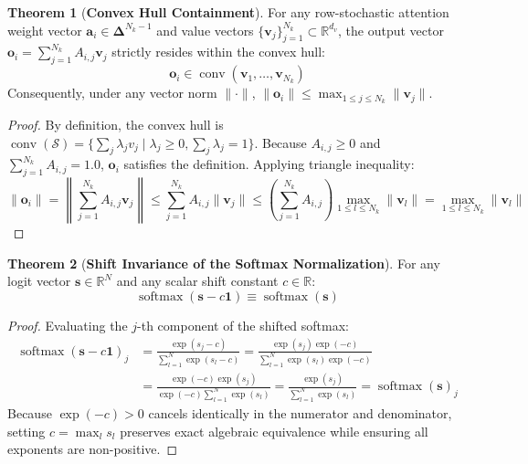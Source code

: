 \documentclass[11pt,a4paper]{article}
\theoremstyle{definition}
\newtheorem{theorem}{\textbf{Theorem}}[section]
\begin{document}
\begin{theorem}[\textbf{Convex Hull Containment}]
For any row-stochastic attention weight vector $\mathbf{a}_i \in \boldsymbol{\Delta}^{N_k - 1}$ and value vectors $\{\mathbf{v}_j\}_{j=1}^{N_k} \subset \mathbb{R}^{d_v}$, the output vector $\mathbf{o}_i = \sum_{j=1}^{N_k} A_{i, j} \mathbf{v}_j$ strictly resides within the convex hull:
{\boldmath
\begin{equation}
\mathbf{o}_i \in \operatorname{conv}(\mathbf{v}_1, \dots, \mathbf{v}_{N_k})
\end{equation}
}
Consequently, under any vector norm $\|\cdot\|$, $\|\mathbf{o}_i\| \le \max_{1 \le j \le N_k} \|\mathbf{v}_j\|$.
\end{theorem}

\begin{proof}
By definition, the convex hull is $\operatorname{conv}(\mathcal{S}) = \{ \sum_{j} \lambda_j v_j \mid \lambda_j \ge 0, \sum_j \lambda_j = 1 \}$. Because $A_{i, j} \ge 0$ and $\sum_{j=1}^{N_k} A_{i, j} = 1.0$, $\mathbf{o}_i$ satisfies the definition. Applying triangle inequality:
{\boldmath
\begin{equation}
\|\mathbf{o}_i\| = \left\| \sum_{j=1}^{N_k} A_{i, j} \mathbf{v}_j \right\| \le \sum_{j=1}^{N_k} A_{i, j} \|\mathbf{v}_j\| \le \left( \sum_{j=1}^{N_k} A_{i, j} \right) \max_{1 \le l \le N_k} \|\mathbf{v}_l\| = \max_{1 \le l \le N_k} \|\mathbf{v}_l\|
\end{equation}
}
\end{proof}

\begin{theorem}[\textbf{Shift Invariance of the Softmax Normalization}]
For any logit vector $\mathbf{s} \in \mathbb{R}^N$ and any scalar shift constant $c \in \mathbb{R}$:
{\boldmath
\begin{equation}
\operatorname{softmax}(\mathbf{s} - c \mathbf{1}) \equiv \operatorname{softmax}(\mathbf{s})
\end{equation}
}
\end{theorem}

\begin{proof}
Evaluating the $j$-th component of the shifted softmax:
{\boldmath
\begin{align}
\operatorname{softmax}(\mathbf{s} - c \mathbf{1})_j &= \frac{\exp(s_j - c)}{\sum_{l=1}^N \exp(s_l - c)} = \frac{\exp(s_j)\exp(-c)}{\sum_{l=1}^N \exp(s_l)\exp(-c)} \\
&= \frac{\exp(-c) \exp(s_j)}{\exp(-c) \sum_{l=1}^N \exp(s_l)} = \frac{\exp(s_j)}{\sum_{l=1}^N \exp(s_l)} = \operatorname{softmax}(\mathbf{s})_j
\end{align}
}
Because $\exp(-c) > 0$ cancels identically in the numerator and denominator, setting $c = \max_l s_l$ preserves exact algebraic equivalence while ensuring all exponents are non-positive.
\end{proof}
\end{document}
